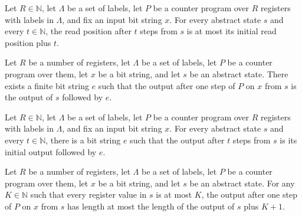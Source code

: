\begin{theorem}
\label{Complexity.CounterProg.run_pos_le}
\leanok
{}
Let $R\in\mathbb{N}$, let $\Lambda$ be a set of labels, let $P$ be a counter program
over $R$ registers with labels in $\Lambda$, and fix an input bit string $x$. For every
abstract state $s$ and every $t\in\mathbb{N}$, the read position after $t$ steps from
$s$ is at most its initial read position plus $t$.
\end{theorem}

\begin{theorem}
\label{Complexity.CounterProg.step_out}
\leanok
{}
Let $R$ be a number of registers, let $\Lambda$ be a set of labels, let $P$ be a counter
program over them, let $x$ be a bit string, and let $s$ be an abstract state. There
exists a finite bit string $e$ such that the output after one step of $P$ on $x$ from
$s$ is the output of $s$ followed by $e$.
\end{theorem}

\begin{theorem}
\label{Complexity.CounterProg.run_out}
\leanok
{}
Let $R\in\mathbb{N}$, let $\Lambda$ be a set of labels, let $P$ be a counter program
over $R$ registers with labels in $\Lambda$, and fix an input bit string $x$. For every
abstract state $s$ and every $t\in\mathbb{N}$, there is a bit string $e$ such that the
output after $t$ steps from $s$ is its initial output followed by $e$.
\end{theorem}

\begin{theorem}
\label{Complexity.CounterProg.step_out_le}
\leanok
{}
Let $R$ be a number of registers, let $\Lambda$ be a set of labels, let $P$ be a counter
program over them, let $x$ be a bit string, and let $s$ be an abstract state. For any
$K\in\mathbb{N}$ such that every register value in $s$ is at most $K$, the output after
one step of $P$ on $x$ from $s$ has length at most the length of the output of $s$ plus
$K+1$.
\end{theorem}

